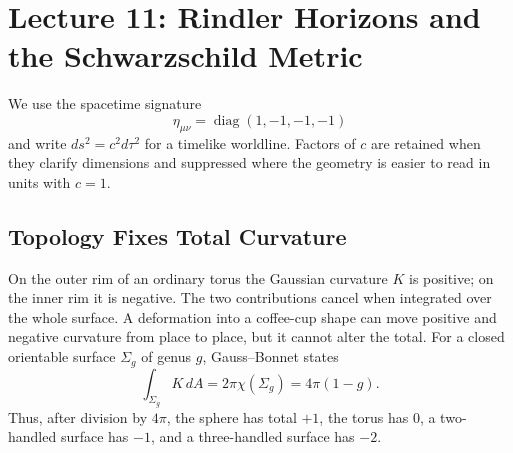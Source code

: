 \chapter{Lecture 11: Rindler Horizons and the Schwarzschild Metric}


We use the spacetime signature
\begin{equation}
  \eta_{\mu\nu}=\operatorname{diag}(1,-1,-1,-1)
  \label{eq:l11-signature}
\end{equation}
and write \(ds^2=c^2d\tau^2\) for a timelike worldline.  Factors of
\(c\) are retained when they clarify dimensions and suppressed where
the geometry is easier to read in units with \(c=1\).

\section{Topology Fixes Total Curvature}

On the outer rim of an ordinary torus the Gaussian curvature \(K\) is
positive; on the inner rim it is negative.  The two contributions
cancel when integrated over the whole surface.  A deformation into a
coffee-cup shape can move positive and negative curvature from place to
place, but it cannot alter the total.  For a closed orientable surface
\(\Sigma_g\) of genus \(g\), Gauss--Bonnet states
\begin{equation}
  \boxed{\int_{\Sigma_g}K\,dA
  =2\pi\chi(\Sigma_g)
  =4\pi(1-g).}
  \label{eq:l11-gauss-bonnet}
\end{equation}
Thus, after division by \(4\pi\), the sphere has total \(+1\), the
torus has \(0\), a two-handled surface has \(-1\), and a three-handled
surface has \(-2\).

